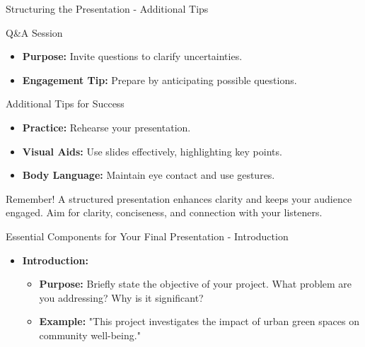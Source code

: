 \documentclass[aspectratio=169]{beamer}
\begin{document}
\begin{frame}[fragile]{Structuring the Presentation - Additional Tips}
    \begin{block}{Q\&A Session}
        \begin{itemize}
            \item \textbf{Purpose:} Invite questions to clarify uncertainties.
            \item \textbf{Engagement Tip:} Prepare by anticipating possible questions.
        \end{itemize}
    \end{block}
    
    \begin{block}{Additional Tips for Success}
        \begin{itemize}
            \item \textbf{Practice:} Rehearse your presentation.
            \item \textbf{Visual Aids:} Use slides effectively, highlighting key points.
            \item \textbf{Body Language:} Maintain eye contact and use gestures.
        \end{itemize}
    \end{block}
    
    \begin{block}{Remember!}
        A structured presentation enhances clarity and keeps your audience engaged. Aim for clarity, conciseness, and connection with your listeners.
    \end{block}
\end{frame}

\begin{frame}[fragile]{Essential Components for Your Final Presentation - Introduction}
    \begin{itemize}
        \item \textbf{Introduction:}
        \begin{itemize}
            \item \textbf{Purpose:} Briefly state the objective of your project. What problem are you addressing? Why is it significant?
            \item \textbf{Example:} "This project investigates the impact of urban green spaces on community well-being."
        \end{itemize}
    \end{itemize}
\end{frame}
\end{document}
